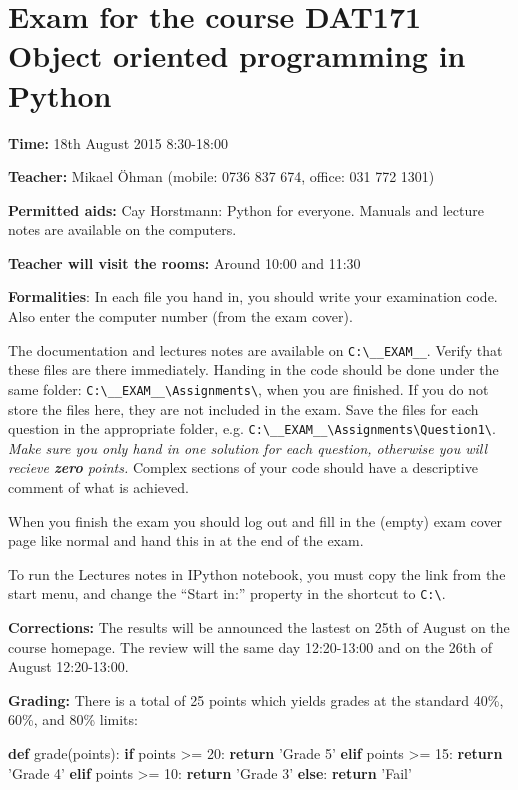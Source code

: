 \documentclass[]{article}
\author{}
\date{}
\newenvironment{Shaded}{}{}
\newcommand{\KeywordTok}[1]{\textcolor[rgb]{0.00,0.44,0.13}{\textbf{{#1}}}}
\newcommand{\DecValTok}[1]{\textcolor[rgb]{0.25,0.63,0.44}{{#1}}}
\newcommand{\StringTok}[1]{\textcolor[rgb]{0.25,0.44,0.63}{{#1}}}
\newcommand{\NormalTok}[1]{{#1}}
\begin{document}
\section{Exam for the course DAT171 Object oriented programming in
Python}\label{exam-for-the-course-dat171-object-oriented-programming-in-python}

\textbf{Time:} 18th August 2015 8:30-18:00

\textbf{Teacher:} Mikael Öhman (mobile: 0736 837 674, office: 031 772
1301)

\textbf{Permitted aids:} Cay Horstmann: Python for everyone. Manuals and
lecture notes are available on the computers.

\textbf{Teacher will visit the rooms:} Around 10:00 and 11:30

\textbf{Formalities}: In each file you hand in, you should write your
examination code. Also enter the computer number (from the exam cover).

The documentation and lectures notes are available on
\texttt{C:\textbackslash{}\_\_EXAM\_\_}. Verify that these files are
there immediately. Handing in the code should be done under the same
folder:
\texttt{C:\textbackslash{}\_\_EXAM\_\_\textbackslash{}Assignments\textbackslash{}},
when you are finished. If you do not store the files here, they are not
included in the exam. Save the files for each question in the
appropriate folder, e.g.
\texttt{C:\textbackslash{}\_\_EXAM\_\_\textbackslash{}Assignments\textbackslash{}Question1\textbackslash{}}.
\emph{Make sure you only hand in one solution for each question,
otherwise you will recieve \textbf{zero} points.} Complex sections of
your code should have a descriptive comment of what is achieved.

When you finish the exam you should log out and fill in the (empty) exam
cover page like normal and hand this in at the end of the exam.

To run the Lectures notes in IPython notebook, you must copy the link
from the start menu, and change the ``Start in:'' property in the
shortcut to \texttt{C:\textbackslash{}}.

\textbf{Corrections:} The results will be announced the lastest on 25th
of August on the course homepage. The review will the same day
12:20-13:00 and on the 26th of August 12:20-13:00.

\textbf{Grading:} There is a total of 25 points which yields grades at
the standard 40\%, 60\%, and 80\% limits:

\begin{Shaded}
\begin{Highlighting}[]
\KeywordTok{def} \NormalTok{grade(points):}
    \KeywordTok{if} \NormalTok{points >= }\DecValTok{20}\NormalTok{:}
        \KeywordTok{return} \StringTok{'Grade 5'}
    \KeywordTok{elif} \NormalTok{points >= }\DecValTok{15}\NormalTok{:}
        \KeywordTok{return} \StringTok{'Grade 4'}
    \KeywordTok{elif} \NormalTok{points >= }\DecValTok{10}\NormalTok{:}
        \KeywordTok{return} \StringTok{'Grade 3'}
    \KeywordTok{else}\NormalTok{:}
        \KeywordTok{return} \StringTok{'Fail'}
\end{Highlighting}
\end{Shaded}
\end{document}
